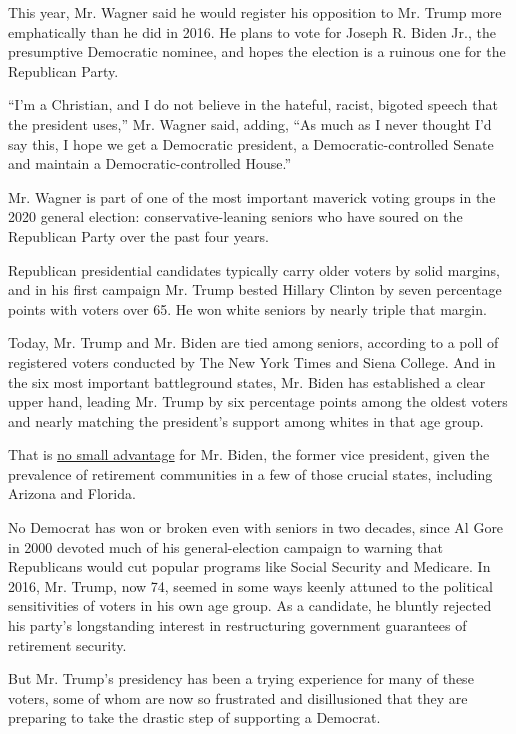 This year, Mr. Wagner said he would register his opposition to Mr. Trump
more emphatically than he did in 2016. He plans to vote for Joseph R.
Biden Jr., the presumptive Democratic nominee, and hopes the election is
a ruinous one for the Republican Party.

``I'm a Christian, and I do not believe in the hateful, racist, bigoted
speech that the president uses,'' Mr. Wagner said, adding, ``As much as
I never thought I'd say this, I hope we get a Democratic president, a
Democratic-controlled Senate and maintain a Democratic-controlled
House.''

Mr. Wagner is part of one of the most important maverick voting groups
in the 2020 general election: conservative-leaning seniors who have
soured on the Republican Party over the past four years.

Republican presidential candidates typically carry older voters by solid
margins, and in his first campaign Mr. Trump bested Hillary Clinton by
seven percentage points with voters over 65. He won white seniors by
nearly triple that margin.

Today, Mr. Trump and Mr. Biden are tied among seniors, according to a
poll of registered voters conducted by The New York Times and Siena
College. And in the six most important battleground states, Mr. Biden
has established a clear upper hand, leading Mr. Trump by six percentage
points among the oldest voters and nearly matching the president's
support among whites in that age group.

That is
\href{https://www.nytimes.com/2020/03/27/us/politics/biden-trump-seniors.html}{no
small advantage} for Mr. Biden, the former vice president, given the
prevalence of retirement communities in a few of those crucial states,
including Arizona and Florida.

No Democrat has won or broken even with seniors in two decades, since Al
Gore in 2000 devoted much of his general-election campaign to warning
that Republicans would cut popular programs like Social Security and
Medicare. In 2016, Mr. Trump, now 74, seemed in some ways keenly attuned
to the political sensitivities of voters in his own age group. As a
candidate, he bluntly rejected his party's longstanding interest in
restructuring government guarantees of retirement security.

But Mr. Trump's presidency has been a trying experience for many of
these voters, some of whom are now so frustrated and disillusioned that
they are preparing to take the drastic step of supporting a Democrat.

